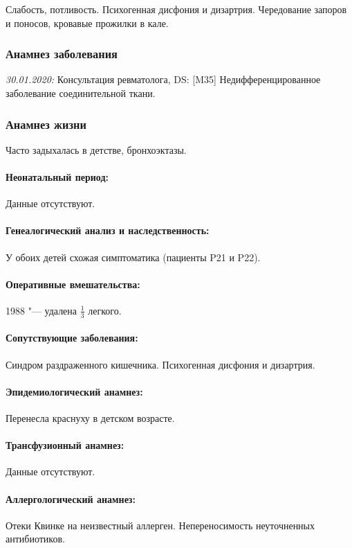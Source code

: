 \documentclass[a4paper,14pt]{extarticle}
\newcommand{\pdate}[1]{\emph{#1:} }
\newcommand{\DS}[2]{[#2] #1}
\begin{document}
Слабость, потливость. Психогенная дисфония и дизартрия. Чередование запоров и поносов, кровавые прожилки в кале.

\subsubsection*{Анамнез заболевания}

\pdate{30.01.2020} Консультация ревматолога, DS: \DS{Недифференцированное заболевание соединительной ткани}{M35}.

\subsubsection*{Анамнез жизни}

Часто задыхалась в детстве, бронхоэктазы.

\paragraph{Неонатальный период:} Данные отсутствуют.

\paragraph{Генеалогический анализ и наследственность:} У обоих детей схожая симптоматика (пациенты P21 и P22).

\paragraph{Оперативные вмешательства:} 1988 "--- удалена $\frac{1}{3}$ легкого.

\paragraph{Сопутствующие заболевания:} Синдром раздраженного кишечника. Психогенная дисфония и дизартрия.

\paragraph{Эпидемиологический анамнез:} Перенесла краснуху в детском возрасте.

\paragraph{Трансфузионный анамнез:} Данные отсутствуют.

\paragraph{Аллергологический анамнез:} Отеки Квинке на неизвестный аллерген. Непереносимость неуточненных антибиотиков.
\end{document}
